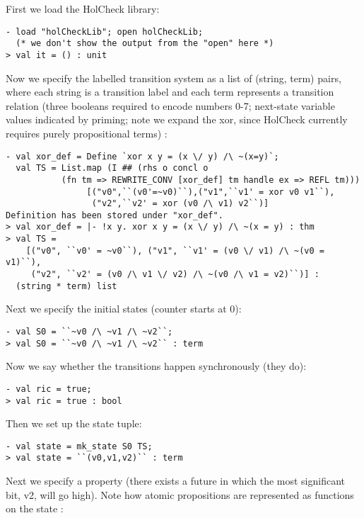 \documentclass[12pt,fleqn]{article}
\newcommand{\hc}{HolCheck}
\begin{document}
First we load the \hc{} library: 
\begin{session}\begin{verbatim}
- load "holCheckLib"; open holCheckLib;
  (* we don't show the output from the "open" here *)
> val it = () : unit
\end{verbatim}\end{session}
Now we specify the labelled transition system as a list of
(string, term) pairs, where each string is a transition label and
each term represents a transition relation (three booleans
required to encode numbers 0-7; next-state variable values
indicated by priming; note we expand the xor, since \hc{} 
currently requires purely propositional terms) :
\begin{session}\begin{verbatim}
- val xor_def = Define `xor x y = (x \/ y) /\ ~(x=y)`;
  val TS = List.map (I ## (rhs o concl o
           (fn tm => REWRITE_CONV [xor_def] tm handle ex => REFL tm)))
                [("v0",``(v0'=~v0)``),("v1",``v1' = xor v0 v1``),
                 ("v2",``v2' = xor (v0 /\ v1) v2``)]
Definition has been stored under "xor_def".
> val xor_def = |- !x y. xor x y = (x \/ y) /\ ~(x = y) : thm
> val TS =
    [("v0", ``v0' = ~v0``), ("v1", ``v1' = (v0 \/ v1) /\ ~(v0 = v1)``),
     ("v2", ``v2' = (v0 /\ v1 \/ v2) /\ ~(v0 /\ v1 = v2)``)] :
  (string * term) list
\end{verbatim}\end{session}
Next we specify the initial states (counter starts at 0):
\begin{session}\begin{verbatim}
- val S0 = ``~v0 /\ ~v1 /\ ~v2``;
> val S0 = ``~v0 /\ ~v1 /\ ~v2`` : term
\end{verbatim}\end{session}
Now we say whether the transitions happen synchronously (they do):
\begin{session}\begin{verbatim}
- val ric = true;
> val ric = true : bool
\end{verbatim}\end{session}
Then we set up the state tuple:
\begin{session}\begin{verbatim}
- val state = mk_state S0 TS;
> val state = ``(v0,v1,v2)`` : term
\end{verbatim}\end{session}
Next we specify a property (there exists a future in which the most significant bit, v2, will go high). Note how atomic propositions are represented as functions on the state :
\end{document}
